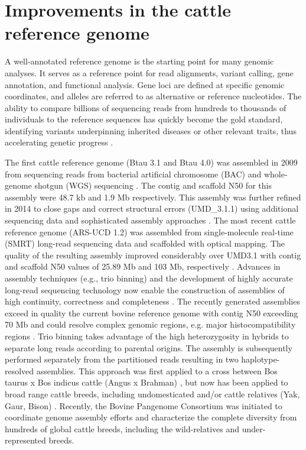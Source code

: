\documentclass[../main.tex]{subfiles}
\begin{document}
\section{Improvements in the cattle reference genome} 

A well-annotated reference genome is the starting point for many genomic analyses. It serves as a reference point for read alignments, variant calling, gene annotation, and functional analysis. Gene loci are defined at specific genomic coordinates, and alleles are referred to as alternative or reference  nucleotides. The ability to compare billions of sequencing reads from hundreds to thousands of individuals to the reference sequences has quickly become the gold standard, identifying variants underpinning  inherited diseases or other relevant traits, thus accelerating genetic progress \citep{bickhart2020symposium}.

The first cattle reference genome (Btau 3.1 and Btau 4.0) was assembled in 2009 from  sequencing reads from bacterial artificial chromosome (BAC) and whole-genome shotgun (WGS) sequencing \citep{elsik2009genome}. The contig and scaffold N50 for this assembly were 48.7 kb and 1.9 Mb respectively. This assembly was further refined in 2014 to close gaps and correct structural errors (UMD\_3.1.1) using additional sequencing data and sophisticated assembly approaches \citep{zimin2009whole}. The most recent cattle reference genome (ARS-UCD 1.2) was assembled from single-molecule real-time (SMRT) long-read sequencing data and scaffolded with optical mapping. The quality of the resulting assembly improved considerably over UMD3.1 with contig and scaffold N50 values of 25.89 Mb and 103 Mb, respectively \citep{rosen2020novo}. Advances in assembly techniques (e.g., trio binning) and the development of highly accurate long-read sequencing technology now enable the construction of assemblies of high continuity, correctness and completeness \citep{bickhart2020symposium}. The recently generated assemblies exceed in quality the current bovine reference genome with contig N50 exceeding 70 Mb and could resolve complex genomic regions, e.g. major histocompatibility regions \citep{rice2020continuous}. Trio binning takes advantage of the high heterozygosity in hybrids to separate long reads according to parental origins. The assembly is subsequently performed separately from the partitioned reads resulting in two haplotype-resolved assemblies. This approach  was first applied  to a cross between Bos taurus x Bos indicus cattle (Angus x Brahman) \citep{koren2018novo}, but now has been applied to broad range cattle breeds, including  undomesticated and/or cattle relatives (Yak, Gaur, Bison) \citep{oppenheimer2021reference}. Recently, the Bovine Pangenome Consortium \citep{heaton2021reference} was initiated to coordinate genome assembly efforts and characterize the complete diversity from hundreds of global cattle breeds, including the wild-relatives and under-represented breeds. 
\end{document}
